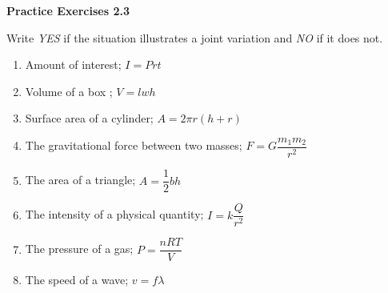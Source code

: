 \vspace{0.3ex}
\noindent\textbf{Practice Exercises 2.3}

\vspace{0.2ex}

Write \emph{YES} if the situation illustrates a joint variation and \emph{NO} if it does not.

\begin{enumerate}[noitemsep, label = \color{blue}\arabic*. ]
   \item Amount of interest; $I = Prt$
   \item Volume of a box ; $V = lwh$
   \item Surface area of a cylinder; $A = 2\pi r(h + r)$
   \item The gravitational force between two masses; $F = G \dfrac{m_1 m_2}{r^2}$
   \item The area of a triangle; $A = \dfrac{1}{2}bh$
   \item The intensity of a physical quantity; $I = k \dfrac{Q}{r^2}$
   \item The pressure of a gas; $P = \dfrac{nRT}{V}$
   \item The speed of a wave; $v = f\lambda$ 
      
\end{enumerate}
